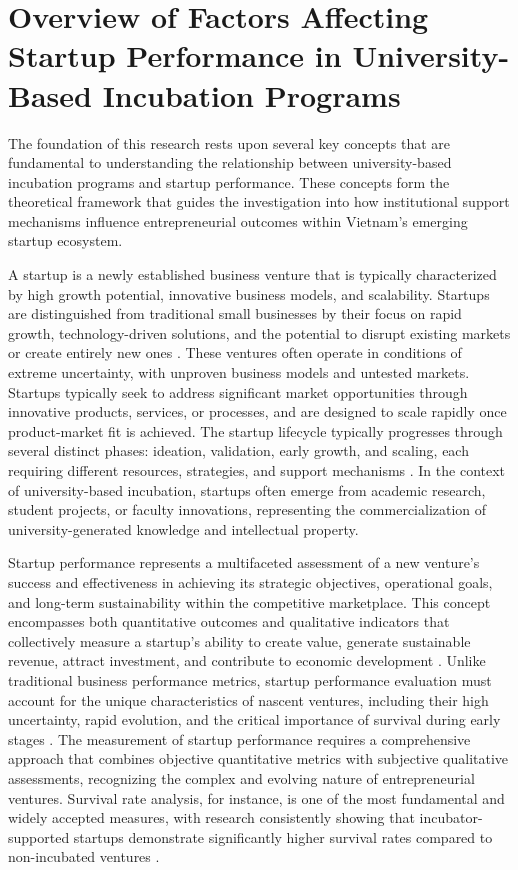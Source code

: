 \documentclass[../Main.tex]{subfiles}
\begin{document}
\section{Overview of Factors Affecting Startup Performance in University-Based Incubation Programs}

The foundation of this research rests upon several key concepts that are fundamental to understanding the relationship between university-based incubation programs and startup performance. These concepts form the theoretical framework that guides the investigation into how institutional support mechanisms influence entrepreneurial outcomes within Vietnam's emerging startup ecosystem.

A startup is a newly established business venture that is typically characterized by high growth potential, innovative business models, and scalability. Startups are distinguished from traditional small businesses by their focus on rapid growth, technology-driven solutions, and the potential to disrupt existing markets or create entirely new ones \cite{blank2013startup, ries2011lean}. These ventures often operate in conditions of extreme uncertainty, with unproven business models and untested markets. Startups typically seek to address significant market opportunities through innovative products, services, or processes, and are designed to scale rapidly once product-market fit is achieved. The startup lifecycle typically progresses through several distinct phases: ideation, validation, early growth, and scaling, each requiring different resources, strategies, and support mechanisms \cite{osterwalder2010business}. In the context of university-based incubation, startups often emerge from academic research, student projects, or faculty innovations, representing the commercialization of university-generated knowledge and intellectual property.

Startup performance represents a multifaceted assessment of a new venture's success and effectiveness in achieving its strategic objectives, operational goals, and long-term sustainability within the competitive marketplace. This concept encompasses both quantitative outcomes and qualitative indicators that collectively measure a startup's ability to create value, generate sustainable revenue, attract investment, and contribute to economic development \cite{patton2014realising, barbero2012revisiting}. Unlike traditional business performance metrics, startup performance evaluation must account for the unique characteristics of nascent ventures, including their high uncertainty, rapid evolution, and the critical importance of survival during early stages \cite{mian1996assessing}. The measurement of startup performance requires a comprehensive approach that combines objective quantitative metrics with subjective qualitative assessments, recognizing the complex and evolving nature of entrepreneurial ventures. Survival rate analysis, for instance, is one of the most fundamental and widely accepted measures, with research consistently showing that incubator-supported startups demonstrate significantly higher survival rates compared to non-incubated ventures \cite{NBIA2012}.
\end{document}
